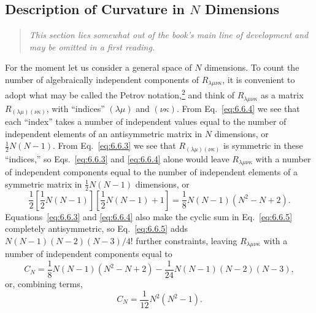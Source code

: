 
\subsection[Description of Curvature in N Dimensions*]
{Description of Curvature in \(N\) Dimensions\optionalreading}\label{sec:6.7}

\begin{quote}
\small\emph{This section lies somewhat out of the book's main line of
development and may be omitted in a first reading.}
\end{quote}

For the moment let us consider a general space of \(N\) dimensions. To count
the number of algebraically independent components of
\(R_{\lambda\mu\nu\kappa}\), it is convenient to adopt what may be called the
Petrov notation,\hyperref[ch6-ref-2]{\textsuperscript{2}} and think of
\(R_{\lambda\mu\nu\kappa}\) as a matrix
\(R_{(\lambda\mu)(\nu\kappa)}\), with ``indices'' \((\lambda\mu)\) and
\((\nu\kappa)\). From Eq.~\eqref{eq:6.6.4} we see that each ``index'' takes a
number of independent values equal to the number of independent elements of
an antisymmetric matrix in \(N\) dimensions, or
\(\tfrac12N(N-1)\). From Eq.~\eqref{eq:6.6.3} we see that
\(R_{(\lambda\mu)(\nu\kappa)}\) is symmetric in these ``indices,'' so
Eqs.~\eqref{eq:6.6.3} and \eqref{eq:6.6.4} alone would leave
\(R_{\lambda\mu\nu\kappa}\) with a number of independent components equal to
the number of independent elements of a symmetric matrix in
\(\tfrac12N(N-1)\) dimensions, or
\[
  \frac12
  \left[\frac12N(N-1)\right]
  \left[\frac12N(N-1)+1\right]
  =
  \frac18N(N-1)(N^2-N+2).
\]
Equations~\eqref{eq:6.6.3} and \eqref{eq:6.6.4} also make the cyclic sum in
Eq.~\eqref{eq:6.6.5} completely antisymmetric, so
Eq.~\eqref{eq:6.6.5} adds
\(N(N-1)(N-2)(N-3)/4!\) further constraints, leaving
\(R_{\lambda\mu\nu\kappa}\) with a number of independent components equal to
\[
  C_N
  =
  \frac18N(N-1)(N^2-N+2)
  -\frac1{24}N(N-1)(N-2)(N-3),
\]
or, combining terms,
\begin{equation}
  C_N
  =
  \frac1{12}N^2(N^2-1).
  \tag{6.7.1}\label{eq:6.7.1}
\end{equation}

